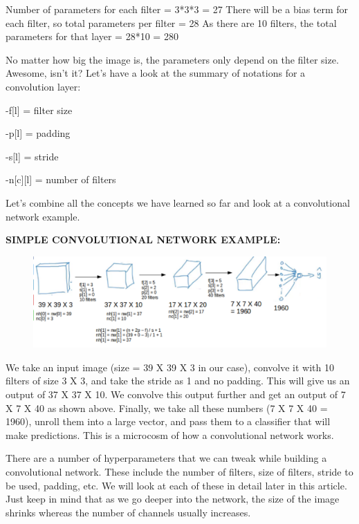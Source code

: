 \documentclass[a4paper]{article}
\begin{document}
 Number of parameters for each filter = 3*3*3 = 27
There will be a bias term for each filter, so total parameters per filter = 28
As there are 10 filters, the total parameters for that layer = 28*10 = 280

No matter how big the image is, the parameters only depend on the filter size. Awesome, isn’t it? Let’s have a look at the summary of notations for a convolution layer: 

    -f[l] = filter size
    
    -p[l] = padding
    
    -s[l] = stride
    
    -n[c][l] = number of filters
    
    Let’s combine all the concepts we have learned so far and look at a convolutional network example. 
       
\textbf{SIMPLE CONVOLUTIONAL NETWORK EXAMPLE:}
      
{
\begin{figure}[htp]
    \centering
    \includegraphics[width=15cm]{CNN.png}
\end{figure}
}

We take an input image (size = 39 X 39 X 3 in our case), convolve it with 10 filters of size 3 X 3, and take the stride as 1 and no padding. This will give us an output of 37 X 37 X 10. We convolve this output further and get an output of 7 X 7 X 40 as shown above. Finally, we take all these numbers (7 X 7 X 40 = 1960), unroll them into a large vector, and pass them to a classifier that will make predictions. This is a microcosm of how a convolutional network works.

\clearpage

There are a number of hyperparameters that we can tweak while building a convolutional network. These include the number of filters, size of filters, stride to be used, padding, etc. We will look at each of these in detail later in this article. Just keep in mind that as we go deeper into the network, the size of the image shrinks whereas the number of channels usually increases. 
\end{document}
